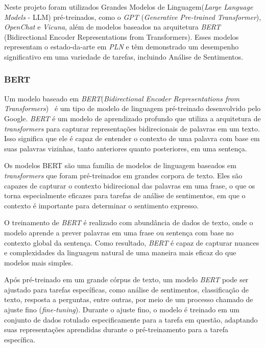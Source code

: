 Neste projeto foram utilizados Grandes Modelos de Linguagem(\textit{Large Language Models} - LLM) pré-treinados, como o \textit{GPT} (\textit{Generative Pre-trained Transformer}), \textit{OpenChat} e \textit{Vicuna}, além de modelos baseados na arquitetura \textit{BERT} (Bidirectional Encoder Representations from Transformers)\cite{hugoZanini2021mediu}. Esses modelos representam o estado-da-arte em \textit{PLN} e têm demonstrado um desempenho significativo em uma variedade de tarefas, incluindo Análise de Sentimentos.

\subsubsection[BERT]{BERT}
\label{cap:fund_teorica:sec:modelos:subsec:bert}

Um modelo baseado em \textit{BERT}(\textit{Bidirectional Encoder Representations from Transformers})~\cite{devlin2019bert} é um tipo de modelo de linguagem pré-treinado desenvolvido pelo Google. \textit{BERT} é um modelo de aprendizado profundo que utiliza a arquitetura de \textit{transformers} para capturar representações bidirecionais de palavras em um texto. Isso significa que ele é capaz de entender o contexto de uma palavra com base em suas palavras vizinhas, tanto anteriores quanto posteriores, em uma sentença.

Os modelos BERT são uma família de modelos de linguagem baseados em \textit{transformers} que foram pré-treinados em grandes corpora de texto. Eles são capazes de capturar o contexto bidirecional das palavras em uma frase, o que os torna especialmente eficazes para tarefas de análise de sentimentos, em que o contexto é importante para determinar o sentimento expresso.

O treinamento de \textit{BERT} é realizado com abundância de dados de texto, onde o modelo aprende a prever palavras em uma frase ou sentença com base no contexto global da sentença. Como resultado, \textit{BERT} é capaz de capturar nuances e complexidades da linguagem natural de uma maneira mais eficaz do que modelos mais simples.

Após pré-treinado em um grande córpus de texto, um modelo \textit{BERT} pode ser ajustado para tarefas específicas, como análise de sentimentos, classificação de texto, resposta a perguntas, entre outras, por meio de um processo chamado de ajuste fino (\textit{fine-tuning}). Durante o ajuste fino, o modelo é treinado em um conjunto de dados rotulado especificamente para a tarefa em questão, adaptando suas representações aprendidas durante o pré-treinamento para a tarefa específica.


